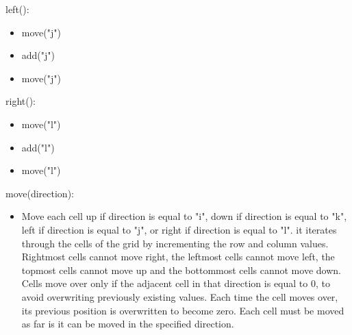 \documentclass[12pt]{article}
\begin{document}
\noindent left():
\begin{itemize}
\item \mbox{move("j")}
\item \mbox{add("j")}
\item \mbox{move("j")}
\end{itemize}

\noindent right():
\begin{itemize}
\item \mbox{move("l")}
\item \mbox{add("l")}
\item \mbox{move("l")}
\end{itemize}

\noindent move(direction):
\begin{itemize}
\item Move each cell up if direction is equal to "i", down if direction is equal to "k", left if direction is equal to "j", or right if direction is equal to "l". it iterates through the cells of the grid by incrementing the row and column values. Rightmost cells cannot move right, the leftmost cells cannot move left, the topmost cells cannot move up and the bottommost cells cannot move down. Cells move over only if the adjacent cell in that direction is equal to 0, to avoid overwriting previously existing values. Each time the cell moves over, its previous position is overwritten to become zero. Each cell must be moved as far is it can be moved in the specified direction.
\end{itemize}
\end{document}
